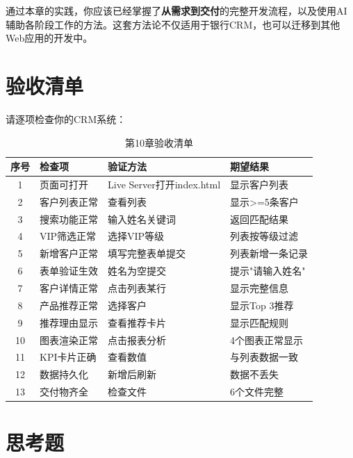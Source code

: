 通过本章的实践，你应该已经掌握了\textbf{从需求到交付}的完整开发流程，以及使用AI辅助各阶段工作的方法。这套方法论不仅适用于银行CRM，也可以迁移到其他Web应用的开发中。

\section{验收清单}

请逐项检查你的CRM系统：

\begin{table}[H]
\centering
\begin{tabular}{clll}
\toprule
\textbf{序号} & \textbf{检查项} & \textbf{验证方法} & \textbf{期望结果} \\
\midrule
1 & 页面可打开 & Live Server打开index.html & 显示客户列表 \\
2 & 客户列表正常 & 查看列表 & 显示>=5条客户 \\
3 & 搜索功能正常 & 输入姓名关键词 & 返回匹配结果 \\
4 & VIP筛选正常 & 选择VIP等级 & 列表按等级过滤 \\
5 & 新增客户正常 & 填写完整表单提交 & 列表新增一条记录 \\
6 & 表单验证生效 & 姓名为空提交 & 提示"请输入姓名" \\
7 & 客户详情正常 & 点击列表某行 & 显示完整信息 \\
8 & 产品推荐正常 & 选择客户 & 显示Top 3推荐 \\
9 & 推荐理由显示 & 查看推荐卡片 & 显示匹配规则 \\
10 & 图表渲染正常 & 点击报表分析 & 4个图表正常显示 \\
11 & KPI卡片正确 & 查看数值 & 与列表数据一致 \\
12 & 数据持久化 & 新增后刷新 & 数据不丢失 \\
13 & 交付物齐全 & 检查文件 & 6个文件完整 \\
\bottomrule
\end{tabular}
\caption{第10章验收清单}
\end{table}

\section{思考题}

